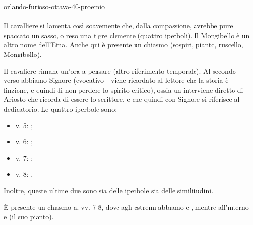 \documentclass[preview]{standalone}
\begin{document}
\begin{snippet}{orlando-furioso-ottava-40-proemio}
    \\\\
    Il cavalliere si lamenta così soavemente che, dalla compassione, avrebbe
    pure spaccato un sasso, o reso una tigre clemente (quattro iperboli).
    Il Mongibello è un altro nome dell'Etna.
    Anche qui è presente un chiasmo (sospiri, pianto, ruscello, Mongibello).

    Il cavaliere rimane un'ora a pensare (altro riferimento temporale).
    Al secondo verso abbiamo Signore (evocativo - viene ricordato al lettore
    che la storia è finzione, e quindi di non perdere lo spirito critico),
    ossia un interviene diretto di Ariosto che ricorda
    di essere lo scrittore, e che quindi con Signore si riferisce al dedicatorio.
    Le quattro iperbole sono:
    \begin{itemize}
        \item v. 5: ;
        \item v. 6: ;
        \item v. 7: ;
        \item v. 8: .
    \end{itemize}
    Inoltre, queste ultime due sono sia delle iperbole sia delle similitudini.

    È presente un chiasmo ai vv. 7-8, dove agli estremi abbiamo  e
    , mentre all'interno  e  (il suo pianto).
\end{snippet}
\end{document}
